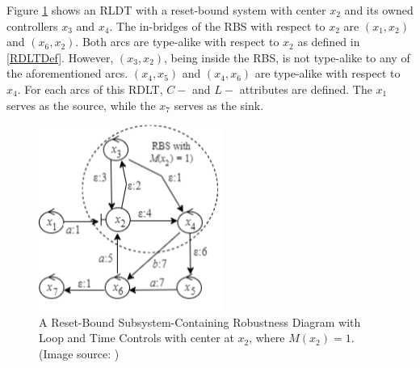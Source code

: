 Figure \ref{sampleRDLT} shows an RLDT with a reset-bound system with center $x_2$ and its owned controllers $x_3$ and $x_4$. The in-bridges of the RBS with respect to $x_2$ are $(x_1, x_2)$ and $(x_6,x_2)$. Both arcs are type-alike with respect to $x_2$ as defined in \ref{RDLTDef}. However, $(x_3,x_2)$, being inside the RBS, is not type-alike to any of the aforementioned arcs. $(x_4, x_5)$ and $(x_4, x_6)$ are type-alike with respect to $x_4$.
For each arcs of this RDLT, $C-$ and $L-$ attributes are defined. The $x_1$ serves as the source, while the $x_7$ serves as the sink. 
\begin{figure} [H]
    \centering
    \includegraphics[width=6cm]{../figures/sampleRDLT.png}
    \caption{A Reset-Bound Subsystem-Containing Robustness Diagram with Loop and Time Controls with center at $x_2$, where $M(x_2)=1$. (Image source: \cite{MalinaoWCTP2023})}
    \label{sampleRDLT}
 \end{figure}

